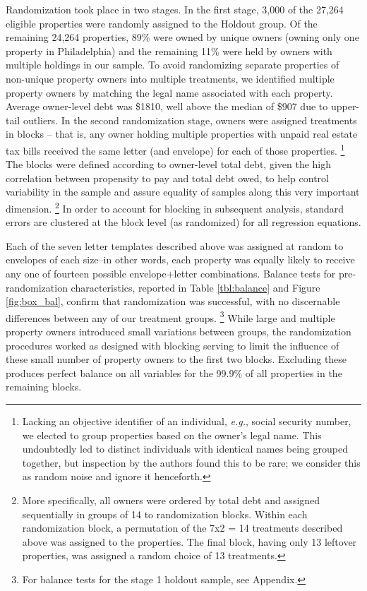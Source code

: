 \documentclass[12pt,titlepage]{article}
\begin{document}
Randomization took place in two stages. In the first stage, 3,000 
of the 27,264 eligible properties were randomly assigned 
to the Holdout group. Of the remaining 24,264 properties, 89\% were 
owned by unique owners (owning only one property in Philadelphia) and 
the remaining 11\% were held by owners with multiple holdings in our sample. To avoid 
randomizing separate properties of non-unique property owners into 
multiple treatments, we identified multiple property owners by 
matching the legal name associated with each property. Average 
owner-level debt was \$1810, well above the median of \$907 due to 
upper-tail outliers. In the second randomization stage, owners were 
assigned treatments in blocks – that is, any owner holding multiple 
properties with unpaid real estate tax bills received the same letter 
(and envelope) for each of those properties.
\footnote{
	Lacking an objective identifier of an individual, \textit{e.g.}, social 
	security number, we elected to group properties based on 
	the owner's legal name. This undoubtedly led to distinct 
	individuals with identical names being grouped together, but 
	inspection by the authors found this to be rare; we consider this 
	as random noise and ignore it henceforth.
}
The blocks were defined according to owner-level total debt, given 
the high correlation between propensity to pay and total debt owed, 
to help control variability in the sample and assure equality of 
samples along this very important dimension.
\footnote{
	More specifically, all owners were ordered by total debt and assigned 
	sequentially in groups of 14 to randomization blocks. Within each 
	randomization block, a permutation of the 7x2 = 14 treatments described 
	above was assigned to the properties. The final block, having only 13 
	leftover properties, was assigned a random choice of 13 treatments.
}
In order to account for blocking in subsequent analysis, standard errors 
are clustered at the block level (as randomized) for all regression equations. 

Each of the seven letter templates described above was assigned at random 
to envelopes of each size--in other words, each property was equally 
likely to receive any one of fourteen possible envelope+letter combinations. 
Balance tests for pre-randomization characteristics, 
reported in Table \ref{tbl:balance} and Figure \ref{fig:box_bal}, 
confirm that randomization was successful, 
with no discernable differences between any of our treatment groups.
\footnote{For balance tests for the stage 1 holdout sample, see Appendix.}
While large and multiple property owners introduced small variations 
between groups, the randomization procedures worked as designed with 
blocking serving to limit the influence of these small number of property 
owners to the first two blocks. Excluding these produces perfect balance 
on all variables for the 99.9\% of all properties in the remaining blocks.
\end{document}
